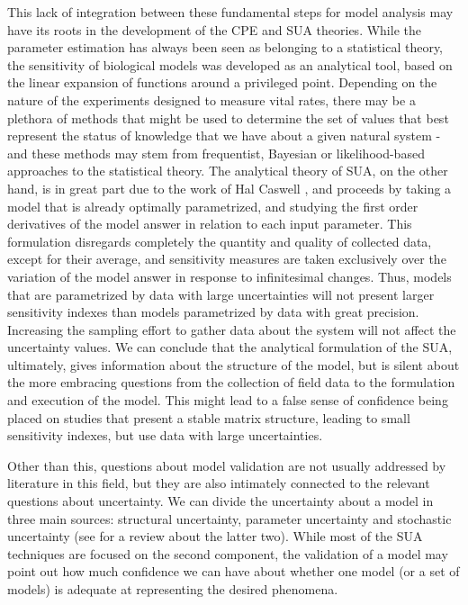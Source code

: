 \documentclass[twoside,12pt,a4paper]{article}
\begin{document}
This lack of integration between these fundamental steps for model analysis may have its roots in the
development of the CPE and SUA theories. While the parameter estimation has always been seen as belonging
to a statistical theory, the sensitivity of biological models was developed as an analytical tool, based on
the linear expansion of functions around a privileged point. Depending on the nature of the experiments
designed to measure vital rates, there may be a plethora of methods that might be used to determine the
set of values that best represent the status of knowledge that we have about a given natural system - and
these methods may stem from frequentist, Bayesian or likelihood-based approaches to the statistical theory.
The analytical theory of SUA, on the other hand, is in great part due to the work of Hal 
Caswell \citep{Caswell89}, and proceeds by taking a model that is already optimally parametrized, and studying
the first order derivatives of the model answer in relation to each input parameter. This formulation 
disregards completely the quantity and quality of collected data, except for their average, and sensitivity
measures are taken exclusively over the variation of the model answer in response to infinitesimal changes.
Thus, models that are parametrized by data with large uncertainties will not present larger sensitivity 
indexes than models parametrized by data with great precision. Increasing the sampling effort to gather
data about the system will not affect the uncertainty values. We can conclude that the analytical formulation
of the SUA, ultimately, gives information about the structure of the model, but is silent about the more
embracing questions from the collection of field data to the formulation and execution of the model. This might
lead to a false sense of confidence being placed on studies that present a stable matrix structure, leading
to small sensitivity indexes, but use data with large uncertainties.

Other than this, questions about model validation are not usually addressed by literature in this field,
but they are also intimately connected to the relevant questions about uncertainty. We can
divide the uncertainty about a model in three main sources: structural uncertainty, parameter uncertainty
and stochastic uncertainty (see \citep{Marino08} for a review about the latter two). While most
of the SUA techniques are focused on the second component, the validation of a model may point out
how much confidence we can have about whether one model (or a set of models) is adequate at
representing the desired phenomena.
\end{document}
